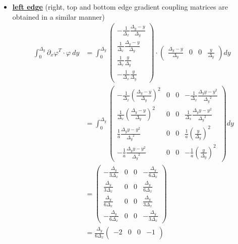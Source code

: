 \documentclass{mc2013}
\newcommand\bs{\boldsymbol}
\newcommand\tf{\varphi}
\renewcommand{\(}{\left(}
\renewcommand{\)}{\right)}
\renewcommand{\[}{\left[}
\renewcommand{\]}{\right]}
\begin{document}
\begin{itemize}
\item \underline{{\bf left edge}} (right, top and bottom edge gradient coupling matrices are obtained in a similar manner)  %
\begin{equation}
\begin{split}
\int_{0}^{{\Delta _y}} \partial_x \tf^{T} \cdot \tf\ dy &= \int_0^{\Delta _y}
\begin{pmatrix}
-\frac{1}{{\Delta _x}}\frac{{\Delta _y}-y}{{\Delta _y}}\\
\frac{1}{{\Delta _x}} \frac{{\Delta _y}-y}{{\Delta _y}}\\
\frac{1}{{\Delta _x}} \frac{y}{{\Delta _y}}\\
-\frac{1}{{\Delta _x}} \frac{y}{{\Delta _y}}
\end{pmatrix}
\cdot
\begin{pmatrix}
\frac{{\Delta _y}-y}{{\Delta _y}} & 0 & 0 & \frac{y}{{\Delta _y}}
\end{pmatrix}
dy\\
&= \int_0^{\Delta _y} 
\begin{pmatrix}
-\frac{1}{{\Delta _x}} \(\frac{{\Delta _y}-y}{{\Delta _y}}\)^2 & 0 & 0 & -\frac{1}{{\Delta _x}} \frac{{\Delta _y}y-y^2}{{\Delta _y}^2} \\
\frac{1}{{\Delta _x}} \(\frac{{\Delta _y}-y}{{\Delta _y}}\)^2  & 0 & 0 & \frac{1}{{\Delta _x}} \frac{{\Delta _y}y-y^2}{{\Delta _y}^2}\\
\frac{1}{a} \frac{{\Delta _y}y-y^2}{{\Delta _y}^2}   & 0 & 0 & \frac{1}{a} \(\frac{y}{{\Delta _y}}\)^2 \\
-\frac{1}{a} \frac{{\Delta _y}y-y^2}{{\Delta _y}^2}  & 0 & 0 & -\frac{1}{a} \(\frac{y}{{\Delta _y}}\)^2
\end{pmatrix}
dy\\
&= 
\begin{pmatrix}
-\frac{{\Delta _y}}{3{\Delta _x}} & 0 & 0 & -\frac{{\Delta _y}}{6{\Delta _x}} \\
\frac{{\Delta _y}}{3{\Delta _x}} & 0 & 0 & \frac{{\Delta _y}}{6{\Delta _x}} \\
\frac{{\Delta _y}}{6{\Delta _x}} & 0 & 0 & \frac{{\Delta _y}}{3{\Delta _x}} \\
-\frac{{\Delta _y}}{6{\Delta _x}} & 0 & 0 & -\frac{{\Delta _y}}{3{\Delta _x}}
\end{pmatrix}\\
& = \frac{{\Delta _y}}{6{\Delta _x}}
\begin{pmatrix}
-2 & 0 & 0 & -1 \\

\end{pmatrix}
\end{split}
\end{equation}
\end{itemize}
\end{document}
